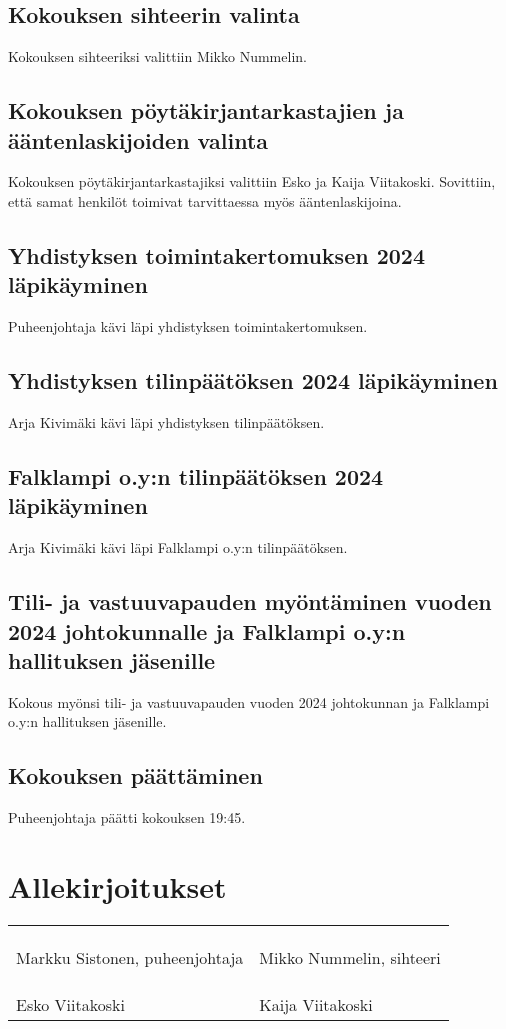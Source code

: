 \documentclass[a4paper,12pt]{article}
\begin{document}
\subsection{Kokouksen sihteerin valinta}
Kokouksen sihteeriksi valittiin Mikko Nummelin.
\subsection{Kokouksen pöytäkirjantarkastajien ja ääntenlaskijoiden valinta}
Kokouksen pöytäkirjantarkastajiksi valittiin Esko ja Kaija Viitakoski. Sovittiin, että samat henkilöt toimivat tarvittaessa myös ääntenlaskijoina.
\subsection{Yhdistyksen toimintakertomuksen 2024 läpikäyminen}
Puheenjohtaja kävi läpi yhdistyksen toimintakertomuksen.
\subsection{Yhdistyksen tilinpäätöksen 2024 läpikäyminen}
Arja Kivimäki kävi läpi yhdistyksen tilinpäätöksen.
\subsection{Falklampi o.y:n tilinpäätöksen 2024 läpikäyminen}
Arja Kivimäki kävi läpi Falklampi o.y:n tilinpäätöksen.
\subsection{Tili- ja vastuuvapauden myöntäminen vuoden 2024 johtokunnalle ja Falklampi o.y:n hallituksen jäsenille}
Kokous myönsi tili- ja vastuuvapauden vuoden 2024 johtokunnan ja Falklampi o.y:n hallituksen jäsenille.
\subsection{Kokouksen päättäminen}
Puheenjohtaja päätti kokouksen 19:45.
\section*{Allekirjoitukset}
\begin{flushleft}
\begin{tabular}{ll}
& \\
& \\
& \\
Markku Sistonen, puheenjohtaja &
Mikko Nummelin, sihteeri \\
& \\
& \\
& \\
Esko Viitakoski &
Kaija Viitakoski
\end{tabular}
\end{flushleft}
\end{document}
